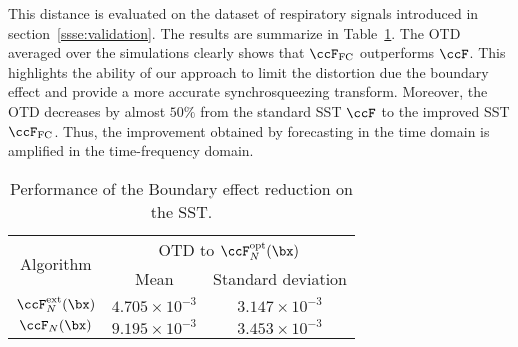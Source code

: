 This distance is evaluated on the dataset of respiratory signals introduced in section~\ref{ssse:validation}. The results are summarize in Table~\ref{tab:otd}. The OTD averaged over the simulations clearly shows that $\ccF_\mathrm{FC}$ outperforms $\ccF$. This highlights the ability of our approach to limit the distortion due the boundary effect and provide a more accurate synchrosqueezing transform. Moreover, the OTD decreases by almost $50\%$ from the standard SST $\ccF$ to the improved SST $\ccF_{\mathrm{FC}}$. Thus, the improvement obtained by forecasting in the time domain is amplified in the time-frequency domain. 

\begin{table}
\centering
\caption{Performance of the Boundary effect reduction on the SST.}
\begin{tabular}{|c||c|c|}
  \hline
   \multirow{2}{*}{Algorithm} & \multicolumn{2}{c|}{OTD to $\ccF_N^{\mathrm{opt}}(\bx)$} \\
   \cline{2-3}
      & Mean & Standard deviation\\
   \hhline{|=#=|=|}
   $\ccF_N^{\mathrm{ext}}(\bx)$ & $4.705\times 10^{-3}$ & $3.147\times 10^{-3}$ \\
   \hline
   $\ccF_N(\bx)$ & $9.195\times 10^{-3}$ & $3.453\times 10^{-3}$ \\
   \hline
\end{tabular}
\label{tab:otd}
\end{table}